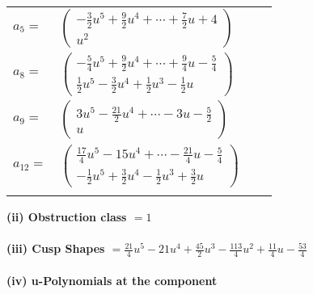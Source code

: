 \documentclass[1p]{elsarticle_modified}
\theoremstyle{definition}
\begin{document}
\begin{tabular}{m{7pt} m{180pt} m{7pt} m{180pt} }
\flushright $a_{5}=$&$\begin{pmatrix}-\frac{3}{2} u^5+\frac{9}{2} u^4+\cdots+\frac{7}{2} u+4\\u^2\end{pmatrix}$ \\
\flushright $a_{8}=$&$\begin{pmatrix}-\frac{5}{4} u^5+\frac{9}{2} u^4+\cdots+\frac{9}{4} u-\frac{5}{4}\\\frac{1}{2} u^5-\frac{3}{2} u^4+\frac{1}{2} u^3-\frac{1}{2} u\end{pmatrix}$ \\
\flushright $a_{9}=$&$\begin{pmatrix}3 u^5-\frac{21}{2} u^4+\cdots-3 u-\frac{5}{2}\\u\end{pmatrix}$ \\
\flushright $a_{12}=$&$\begin{pmatrix}\frac{17}{4} u^5-15 u^4+\cdots-\frac{21}{4} u-\frac{5}{4}\\-\frac{1}{2} u^5+\frac{3}{2} u^4-\frac{1}{2} u^3+\frac{3}{2} u\end{pmatrix}$\\&\end{tabular}
\flushleft \textbf{(ii) Obstruction class $= 1$}\\~\\
\flushleft \textbf{(iii) Cusp Shapes $= \frac{21}{4} u^5-21 u^4+\frac{45}{2} u^3-\frac{113}{4} u^2+\frac{11}{4} u-\frac{53}{4}$}\\~\\
\newpage\renewcommand{\arraystretch}{1}
\flushleft \textbf{(iv) u-Polynomials at the component}\newline \\
\end{document}
